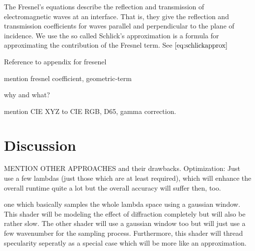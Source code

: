 

The Fresnel's equations describe the reflection and transmission of electromagnetic waves at an interface. That is, they give the reflection and transmission coefficients for waves parallel and perpendicular to the plane of incidence. We use the so called Schlick's approximation is a formula for approximating the contribution of the Fresnel term. See $\ref{eq:schlickapprox}$

Reference to appendix for fresenel

mention fresnel coefficient, geometric-term

why and what?

mention CIE XYZ to CIE RGB, D65, gamma correction.

\section{Discussion}
MENTION OTHER APPROACHES and their drawbacks.
Optimization: Just use a few lambdas (just those which are at least required), which will enhance the overall runtime quite a lot but the overall accuracy will suffer then, too.

one which basically samples the whole lambda space using a gaussian window. This shader will be modeling the effect of diffraction completely but will also be rather slow. The other shader will use a gaussian window too but will just use a few wavenumber for the sampling process. Furthermore, this shader will thread specularity seperatly as a special case which will be more like an approximation. 

